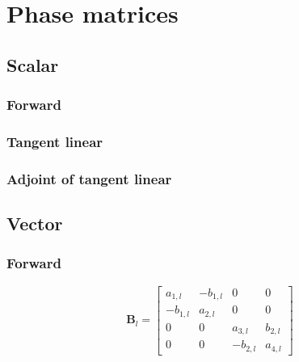 %
\section{Phase matrices}
\label{sec:phase_matrices}


\subsection{Scalar}
\label{sec:phase_matrices-scalar}


\subsubsection{Forward}
\label{sec:phase_matrices-scalar-forward}


\subsubsection{Tangent linear}
\label{sec:phase_matrices-scalar-tangent_linear}


\subsubsection{Adjoint of tangent linear}
\label{sec:phase_matrices-scalar-adjoint_of_tangent_linear}


%
\subsection{Vector}
\label{sec:phase_matrices-vector}


\subsubsection{Forward}
\label{sec:phase_matrices-vector-forward}

\begin{equation}
\mathbf{B}_{l} =
\left[
\begin{array}{cccc}
 a_{1,l} & -b_{1,l} & 0        & 0  \\
-b_{1,l} &  a_{2,l} & 0        & 0  \\
0        & 0        &  a_{3,l} & b_{2,l}  \\
0        & 0        & -b_{2,l} & a_{4,l}
\end{array}
\right]
\label{eq:phase_matrices-vector-forward-B_l}
\end{equation}

